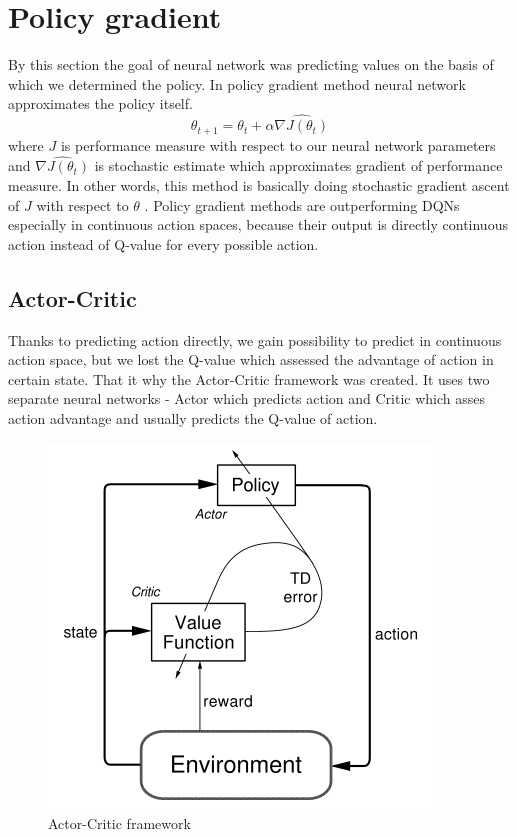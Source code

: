 \section{Policy gradient}
By this section the goal of neural network was predicting values on the basis of which we determined the policy. In policy gradient method neural network approximates the policy itself. 
\begin{equation}
\theta_{t+1} = \theta_t + \alpha \widehat{\nabla J(\theta_t)}
\end{equation}
where $J$ is performance measure with respect to our neural network parameters and $\widehat{\nabla J(\theta_t)}$ is stochastic estimate which approximates gradient of performance measure. In other words, this method is basically doing stochastic gradient ascent of $J$ with respect to $\theta$ \cite{sutton1999}. Policy gradient methods are outperforming DQNs especially in continuous action spaces, because their output is directly continuous action instead of Q-value for every possible action.

\subsection{Actor-Critic}
Thanks to predicting action directly, we gain possibility to predict in continuous action space, but we lost the Q-value which assessed the advantage of action in certain state. That it why the Actor-Critic framework was created. It uses two separate neural networks - Actor which predicts action and Critic which asses action advantage and usually predicts the Q-value of action.
\begin{figure}[!h]
\centering
\includegraphics[scale=0.55]{fig/actor-critic.png}
\caption{Actor-Critic framework}
\end{figure}
\clearpage

